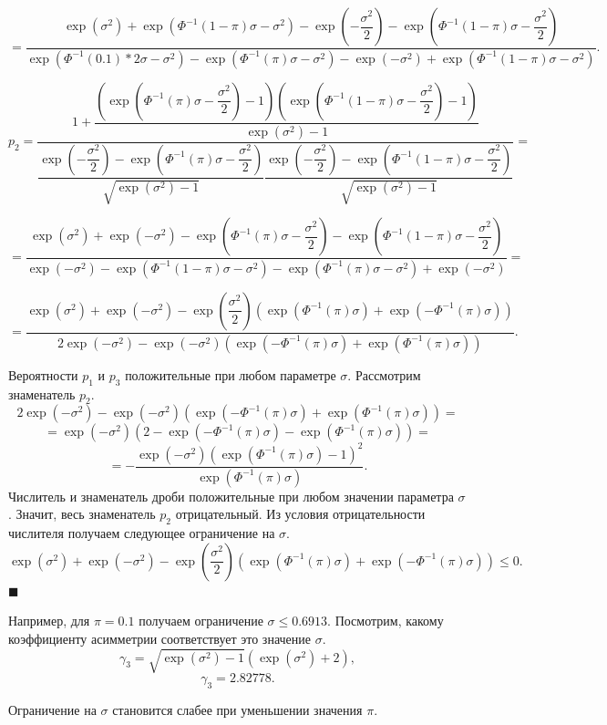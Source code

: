 \documentclass[12pt]{article}
\newenvironment{Proof}{\par\noindent{\bf Доказательство.}}{\hfill$\scriptstyle\blacksquare$}
\begin{document}
\begin{Proof}
		\[=\dfrac{\exp(\sigma^{2})+\exp(\Phi^{-1}(1-\pi)\sigma-\sigma^{2})-\exp(-\dfrac{\sigma^{2}}{2})-\exp(\Phi^{-1}(1-\pi)\sigma-\dfrac{\sigma^{2}}{2})}{\exp(\Phi^{-1}(0.1)*2\sigma-\sigma^{2})-\exp(\Phi^{-1}(\pi)\sigma-\sigma^{2})-\exp(-\sigma^{2})+\exp(\Phi^{-1}(1-\pi)\sigma-\sigma^{2})}.\]
		
		\[p_{2}=\dfrac{1+\dfrac{(\exp(\Phi^{-1}(\pi)\sigma-\dfrac{\sigma^{2}}{2})-1)(\exp(\Phi^{-1}(1-\pi)\sigma-\dfrac{\sigma^{2}}{2})-1)}{\exp(\sigma^{2})-1}}{\dfrac{\exp(-\dfrac{\sigma^{2}}{2})-\exp(\Phi^{-1}(\pi)\sigma-\dfrac{\sigma^{2}}{2})}{\sqrt{\exp(\sigma^{2})-1}}\dfrac{\exp(-\dfrac{\sigma^{2}}{2})-\exp(\Phi^{-1}(1-\pi)\sigma-\dfrac{\sigma^{2}}{2})}{\sqrt{\exp(\sigma^{2})-1}}}=\]
		
		\[=\dfrac{\exp(\sigma^{2})+\exp(-\sigma^{2})-\exp(\Phi^{-1}(\pi)\sigma-\dfrac{\sigma^{2}}{2})-\exp(\Phi^{-1}(1-\pi)\sigma-\dfrac{\sigma^{2}}{2})}{\exp(-\sigma^{2})-\exp(\Phi^{-1}(1-\pi)\sigma-\sigma^{2})-\exp(\Phi^{-1}(\pi)\sigma-\sigma^{2})+\exp(-\sigma^{2})}=\]
		
		\[=\dfrac{\exp(\sigma^{2})+\exp(-\sigma^{2})-\exp\left( \dfrac{\sigma^{2}}{2}\right)\left(\exp(\Phi^{-1}(\pi)\sigma)+\exp(-\Phi^{-1}(\pi)\sigma)\right) }{2\exp(-\sigma^{2})-\exp(-\sigma^{2})\left( \exp(-\Phi^{-1}(\pi)\sigma)+\exp(\Phi^{-1}(\pi)\sigma)\right) }.\]
		
		Вероятности $p_{1}$ и $p_{3}$ положительные при любом параметре $\sigma$. Рассмотрим знаменатель $p_{2}$.
		\[2\exp(-\sigma^{2})-\exp(-\sigma^{2})\left( \exp(-\Phi^{-1}(\pi)\sigma)+\exp(\Phi^{-1}(\pi)\sigma)\right)=\]
		\[=\exp(-\sigma^{2})(2- \exp(-\Phi^{-1}(\pi)\sigma)-\exp(\Phi^{-1}(\pi)\sigma))=\]
		\[=-\dfrac{\exp(-\sigma^{2})(\exp(\Phi^{-1}(\pi)\sigma)-1)^{2}}{\exp(\Phi^{-1}(\pi)\sigma)}.\]
		Числитель и знаменатель дроби положительные при любом значении параметра $\sigma$. Значит, весь знаменатель $p_{2}$ отрицательный. Из условия отрицательности числителя получаем следующее ограничение на $\sigma$.
		\[\exp(\sigma^{2})+\exp(-\sigma^{2})-\exp\left( \dfrac{\sigma^{2}}{2}\right)\left(\exp(\Phi^{-1}(\pi)\sigma)+\exp(-\Phi^{-1}(\pi)\sigma)\right) \leq 0.\]
	\end{Proof}
	
	
	Например, для $\pi=0.1$ получаем ограничение $\sigma\leq 0.6913$. 
	Посмотрим, какому коэффициенту асимметрии соответствует это значение $\sigma$.
	\[\gamma_{3} = \sqrt{\exp(\sigma^{2})-1}(\exp(\sigma^{2})+2),\]
	\[\gamma_{3} = 2.82778.\]
	
	Ограничение на $\sigma$ становится слабее при уменьшении значения $\pi$.
	
\end{document}
